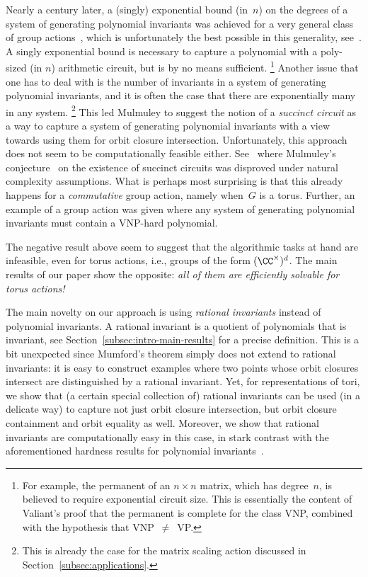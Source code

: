 Nearly a century later, a (singly) exponential bound (in~$n$) on the degrees of a system of generating polynomial invariants was achieved for a very general class of group actions~\cite{Der01}, which is unfortunately the best possible in this generality, see~\cite{DM-exp}.
A singly exponential bound is necessary to capture a polynomial with a poly-sized (in $n$) arithmetic circuit, but is by no means sufficient.
\footnote{For example, the permanent of an $n\times n$ matrix, which has degree~$n$, is believed to require exponential circuit size.
This is essentially the content of Valiant's proof that the permanent is complete for the class VNP, combined with the hypothesis that VNP~$\ne$~VP.}
Another issue that one has to deal with is the number of invariants in a system of generating polynomial invariants, and it is often the case that there are exponentially many in any system.
\footnote{This is already the case for the matrix scaling action discussed in Section~\ref{subsec:applications}.}
This led Mulmuley \cite{GCTV} to suggest the notion of a \emph{succinct circuit} as a way to capture a system of generating polynomial invariants with a view towards using them for orbit closure intersection.
Unfortunately, this approach does not seem to be computationally feasible either.
See~\cite{GIMOWW} where Mulmuley's conjecture~\cite[Conjecture~5.3]{GCTV} on the existence of succinct circuits was disproved under natural complexity assumptions.
What is perhaps most surprising is that this already happens for a \emph{commutative} group action, namely when~$G$ is a torus.
Further, an example of a group action was given where any system of generating polynomial invariants must contain a VNP-hard polynomial.

The negative result above seem to suggest that the algorithmic tasks at hand are infeasible, even for torus actions, i.e., groups of the form $(\CC^\times)^d$.
The main results of our paper show the opposite: \emph{all of them are efficiently solvable for torus actions!}

The main novelty on our approach is using {\em rational invariants} instead of polynomial invariants.
A rational invariant is a quotient of polynomials that is invariant, see Section~\ref{subsec:intro-main-results} for a precise definition.
This is a bit unexpected since Mumford's theorem simply does not extend to rational invariants: it is easy to construct examples where two points whose orbit closures intersect are distinguished by a rational invariant.
Yet, for representations of tori, we show that (a certain special collection of) rational invariants can be used (in a delicate way) to capture not just orbit closure intersection, but orbit closure containment and orbit equality as well.
Moreover, we show that rational invariants are computationally easy in this case, in stark contrast with the aforementioned hardness results for polynomial invariants~\cite{GIMOWW}.

